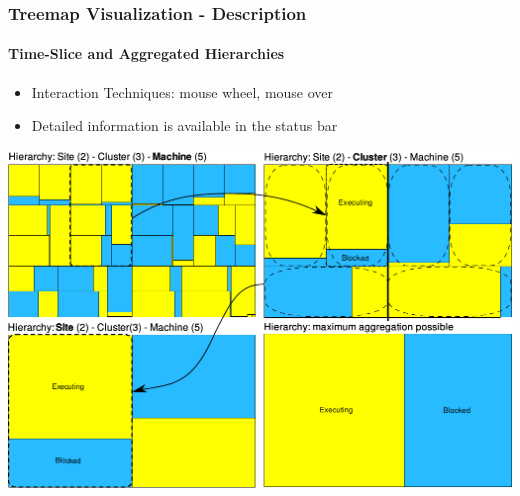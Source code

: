 
%

\frame
{
   \frametitle{Treemap Visualization - Description}
   \framesubtitle{Time-Slice and Aggregated Hierarchies}

   \begin{itemize}
   \item Interaction Techniques: mouse wheel, mouse over
   \item Detailed information is available in the status bar
   \end{itemize}

   \vfill
   \begin{center}
   \includegraphics[width=.9\textwidth]{img/aggregated.pdf}
   \end{center}
}

